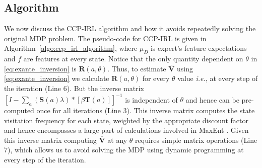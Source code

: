 \documentclass{article}
\begin{document}



\subsection{Algorithm}

We now discuss the CCP-IRL algorithm and how it avoids repeatedly solving the original MDP problem.
The pseudo-code for CCP-IRL is given in Algorithm~\ref{algo:ccp_irl_algorithm}, where $\mu_D$ is expert's feature expectations and $f$ are features at every state.
Notice that the only quantity dependent on $\theta$ in \eqref{eq:exante_inversion} is $\mathbf{R}(a, \theta)$.
Thus, to estimate $\mathbf{\overline{V}}$ using \eqref{eq:exante_inversion} we calculate $\mathbf{R}(a, \theta)$ for every $\theta$ value \emph{i.e.}, at every step of the iteration (Line 6).
But the inverse matrix $\left[I-\sum_{a}(\mathbf{S}(a) \lambda) *\left[ \beta \mathbf{T}(a)  \right]\right]^{-1}$ is independent of $\theta$ and hence can be pre-computed once for all iterations (Line 3).
This inverse matrix computes the state visitation frequency for each state, weighted by the appropriate discount factor and hence encompasses a large part of calculations involved in MaxEnt \cite{ziebart_phd}.
Given this inverse matrix computing $\mathbf{\overline{V}}$ at any $\theta$ requires simple matrix operations (Line 7), which allows us to avoid solving the MDP using dynamic programming at every step of the iteration.
\end{document}
